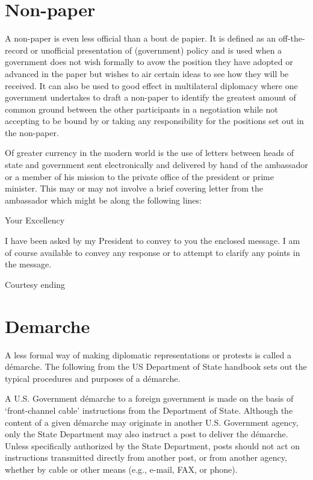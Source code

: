 \documentclass[
  openany]{book}
\begin{document}
\hypertarget{non-paper}{%
\section{Non-paper}\label{non-paper}}

A non-paper is even less official than a bout de papier. It is defined as an off-the-record or unofficial presentation of (government) policy and is used when a government does not wish formally to avow the position they have adopted or advanced in the paper but wishes to air certain ideas to see how they will be received. It can also be used to good effect in multilateral diplomacy where one government undertakes to draft a non-paper to identify the greatest amount of common ground between the other participants in a negotiation while not accepting to be bound by or taking any responsibility for the positions set out in the non-paper.

Of greater currency in the modern world is the use of letters between heads of state and government sent electronically and delivered by hand of the ambassador or a member of his mission to the private office of the president or prime minister. This may or may not involve a brief covering letter from the ambassador which might be along the following lines:

Your Excellency

I have been asked by my President to convey to you the enclosed message. I am of course available to convey any response or to attempt to clarify any points in the message.

Courtesy ending

\hypertarget{demarche}{%
\section{Demarche}\label{demarche}}

A less formal way of making diplomatic representations or protests is called a démarche. The following from the US Department of State handbook sets out the typical procedures and purposes of a démarche.

A U.S. Government démarche to a foreign government is made on the basis of `front-channel cable' instructions from the Department of State. Although the content of a given démarche may originate in another U.S. Government agency, only the State Department may also instruct a post to deliver the démarche. Unless specifically authorized by the State Department, posts should not act on instructions transmitted directly from another post, or from another agency, whether by cable or other means (e.g., e-mail, FAX, or phone).
\end{document}
